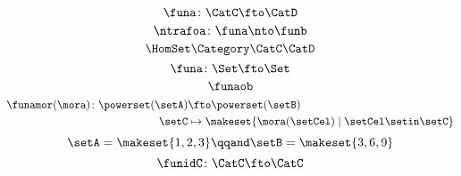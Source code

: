 \begin{forslides}
\begin{equation}
        \funa\colon\CatC\fto\CatD
    \end{equation}
    \begin{equation}
        \label{eq:slides_ntrafoa}
        \ntrafoa\colon\funa\nto\funb
    \end{equation}
    \begin{equation}
        \label{eq:slides_hom}
        \HomSet\Category\CatC\CatD
    \end{equation}
    \begin{equation}
        \label{eq:pow_fun_1}
        \funa\colon \Set \fto \Set
    \end{equation}
    \begin{equation}
        \label{eq:pow_fun_2}
        \funaob
    \end{equation}
    \begin{equation}
        \label{eq:pow_fun_3}
        \begin{aligned}
            \funamor(\mora)\colon \powerset(\setA) & \fto \powerset(\setB) \\
            \setC                                  & \mapsto \makeset{ \mora(\setCel) \mid \setCel \setin \setC}
        \end{aligned}
    \end{equation}
    \begin{equation}
        \label{eq:pow_fun_4}
        \setA=\makeset{ 1,2,3} \qqand \setB=\makeset{3,6,9}
    \end{equation}
    \begin{equation}
        \label{eq:idfun}
        \funidC \colon \CatC \fto \CatC
    \end{equation}

    \begin{forslides}


\end{forslides}
\end{forslides}
